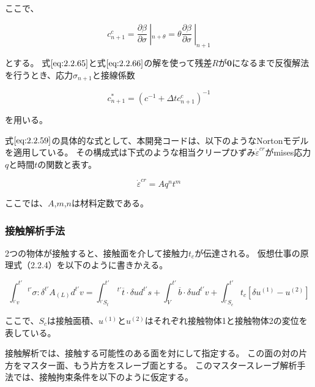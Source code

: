\documentclass[a4paper,pandoc,ja=standard]{bxjsarticle}
\begin{document}
ここで、

\begin{equation}
c_{n + 1}^c = \frac{ \partial \beta} {\partial \sigma}\  |_{n + \theta} = \theta \frac{ \partial \beta}{\partial \sigma}\ |_{n + 1}
\label{eq:2.2.67}
\end{equation}

とする。
式\(\eqref{eq:2.2.65}\)と式\(\eqref{eq:2.2.66}\)の解を使って残差\(R\)が\(\mathbf{0}\)になるまで反復解法を行うとき、応力\(\sigma_{n + 1}\)と接線係数

\begin{equation}
c_{n + 1}^* = ( c^{-1} + \Delta t c_{n + 1}^c )^{- 1}
\label{eq:2.2.68}
\end{equation}

を用いる。

式\(\eqref{eq:2.2.59}\)の具体的な式として、本開発コードは、以下のようなNortonモデルを適用している。
その構成式は下式のような相当クリープひずみ\({\dot{\varepsilon}}^{cr}\)がmises応力\(q\)と時間\(t\)の関数と表す。

\begin{equation}
{\dot{\varepsilon}}^{cr} = A q^n t^m
\label{eq:2.2.69}
\end{equation}

ここでは、\(A\),\(m\),\(n\)は材料定数である。

\hypertarget{ux63a5ux89e6ux89e3ux6790ux624bux6cd5}{%
\subsubsection{接触解析手法}\label{ux63a5ux89e6ux89e3ux6790ux624bux6cd5}}

2つの物体が接触すると、接触面を介して接触力\(t_c\)が伝達される。
仮想仕事の原理式（2.2.4）を以下のように書きかえる。

\begin{equation}
\int^{t'}_{^{t'}v}\,^{t'} \sigma : \delta^{t'} A_{(L)} d^{t'}v = \int^{t'}_{^{t'}S_{t}}\,^{t'} \overline{t} \cdot \delta u d^{t'}s+ \int^{t'}_{V} \overline{b} \cdot \delta u d^{t'}v + \int^{t'}_{^{t'} S _{c}}t_{c}[\delta u^{(1)} - u^{(2)}]
\label{eq:2.2.70}
\end{equation}

ここで、\(S_c\)は接触面積、\(u^{(1)}\)と\(u^{(2)}\)はそれぞれ接触物体1と接触物体2の変位を表している。

接触解析では、接触する可能性のある面を対にして指定する。
この面の対の片方をマスター面、もう片方をスレーブ面とする。
このマスタースレーブ解析手法では、接触拘束条件を以下のように仮定する。
\end{document}
